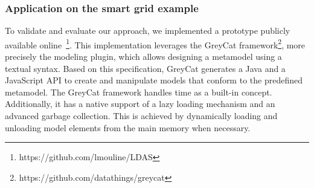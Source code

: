 \subsubsection{Application on the smart grid example}
\label{subsec:tuto}
%
%
%
To validate and evaluate our approach, we implemented a prototype publicly available online~\footnote{https://github.com/lmouline/LDAS}.
This implementation leverages the GreyCat framework\footnote{https://github.com/datathings/greycat}, more precisely the modeling plugin, which allows designing a metamodel using a textual syntax. Based on this specification, GreyCat generates a Java and a JavaScript API to create and manipulate models that conform to the predefined metamodel. The GreyCat framework handles time as a built-in concept. Additionally, it has a native support of a lazy loading mechanism and an advanced garbage collection. This is achieved by dynamically loading and unloading model elements from the main memory when necessary.

